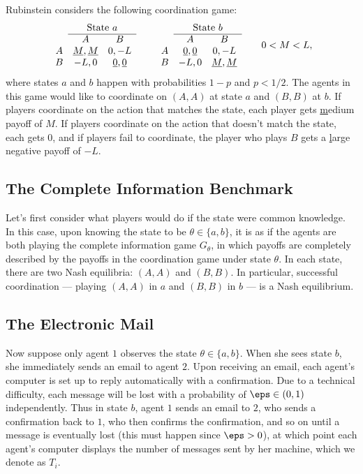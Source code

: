 Rubinstein considers the following coordination game:
\[
  \begin{array}{c cc}
  & \multicolumn{2}{c}{\text{State } a} \\
  \cline{2-3}
  & A & B \\
  A & \underline{M},\underline{M} & 0,-L \\
  B & -L,0 & \underline{0},\underline{0}
  \end{array}
  \qquad
  \begin{array}{c cc}
  & \multicolumn{2}{c}{\text{State } b} \\
  \cline{2-3}
  & A & B \\
  A & \underline{0},\underline{0} & 0,-L \\
  B & -L,0 & \underline{M},\underline{M}
  \end{array}
  \qquad
  0 < M < L,
\]
where states \(a\) and \(b\) happen with probabilities \(1 - p\) and \(p < 1 / 2\).
The agents in this game would like to coordinate on \((A, A)\) at state \(a\) and \((B, B)\) at \(b\).
If players coordinate on the action that matches the state, each player gets \underline{m}edium payoff of \(M\).
If players coordinate on the action that doesn't match the state, each gets \(0\), and if players fail to coordinate, the player who plays \(B\) gets a \underline{l}arge negative payoff of \(-L\).


\subsection{The Complete Information Benchmark}
Let's first consider what players would do if the state were common knowledge.
In this case, upon knowing the state to be \(\theta \in \{a, b\}\), it is as if the agents are both playing the complete information game \(G_\theta\), in which payoffs are completely described by the payoffs in the coordination game under state \(\theta\).
In each state, there are two Nash equilibria: \((A, A)\) and \((B, B)\).
In particular, successful coordination --- playing \((A, A)\) in \(a\) and \((B, B)\) in \(b\) --- is a Nash equilibrium.


\subsection{The Electronic Mail}
Now suppose only agent \(1\) observes the state \(\theta \in \{a, b\}\).
When she sees state \(b\), she immediately sends an email to agent \(2\).
Upon receiving an email, each agent's computer is set up to reply automatically with a confirmation.
Due to a technical difficulty, each message will be lost with a probability of \(\eps \in (0, 1)\) independently.
Thus in state \(b\), agent \(1\) sends an email to \(2\), who sends a confirmation back to \(1\), who then confirms the confirmation, and so on until a message is eventually lost (this must happen since \(\eps > 0\)), at which point each agent's computer displays the number of messages sent by her machine, which we denote as \(T_i\).

